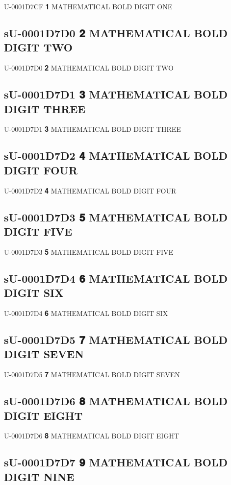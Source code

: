 U-0001D7CF 𝟏 MATHEMATICAL BOLD DIGIT ONE

\subsection{sU-0001D7D0 𝟐 MATHEMATICAL BOLD DIGIT TWO}

U-0001D7D0 𝟐 MATHEMATICAL BOLD DIGIT TWO

\subsection{sU-0001D7D1 𝟑 MATHEMATICAL BOLD DIGIT THREE}

U-0001D7D1 𝟑 MATHEMATICAL BOLD DIGIT THREE

\subsection{sU-0001D7D2 𝟒 MATHEMATICAL BOLD DIGIT FOUR}

U-0001D7D2 𝟒 MATHEMATICAL BOLD DIGIT FOUR

\subsection{sU-0001D7D3 𝟓 MATHEMATICAL BOLD DIGIT FIVE}

U-0001D7D3 𝟓 MATHEMATICAL BOLD DIGIT FIVE

\subsection{sU-0001D7D4 𝟔 MATHEMATICAL BOLD DIGIT SIX}

U-0001D7D4 𝟔 MATHEMATICAL BOLD DIGIT SIX

\subsection{sU-0001D7D5 𝟕 MATHEMATICAL BOLD DIGIT SEVEN}

U-0001D7D5 𝟕 MATHEMATICAL BOLD DIGIT SEVEN

\subsection{sU-0001D7D6 𝟖 MATHEMATICAL BOLD DIGIT EIGHT}

U-0001D7D6 𝟖 MATHEMATICAL BOLD DIGIT EIGHT

\subsection{sU-0001D7D7 𝟗 MATHEMATICAL BOLD DIGIT NINE}

